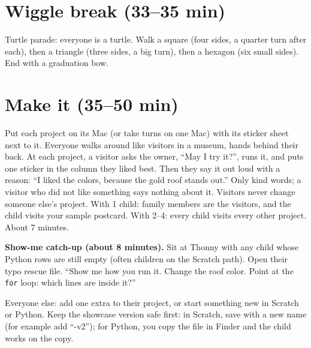 \section{Wiggle break (33--35 min)}
Turtle parade: everyone is a turtle. Walk a square (four sides, a quarter turn after each), then a triangle (three sides, a big turn), then a hexagon (six small sides). End with a graduation bow.

\section{Make it (35--50 min)}
\begin{unplugged}
Put each project on its Mac (or take turns on one Mac) with its sticker sheet next to it. Everyone walks around like visitors in a museum, hands behind their back. At each project, a visitor asks the owner, \enquote{May I try it?}, runs it, and puts one sticker in the column they liked best. Then they say it out loud with a reason: \enquote{I liked the colors, because the gold roof stands out.} Only kind words; a visitor who did not like something says nothing about it. Visitors never change someone else's project. With 1 child: family members are the visitors, and the child visits your sample postcard. With 2--4: every child visits every other project. About 7 minutes.
\end{unplugged}

\textbf{Show-me catch-up (about 8 minutes).} Sit at Thonny with any child whose Python rows are still empty (often children on the Scratch path). Open their typo rescue file. \enquote{Show me how you run it. Change the roof color. Point at the \texttt{for} loop: which lines are inside it?}

\begin{freebuild}
Everyone else: add one extra to their project, or start something new in Scratch or Python. Keep the showcase version safe first: in Scratch, save with a new name (for example add \enquote{-v2}); for Python, you copy the file in Finder and the child works on the copy.
\end{freebuild}

